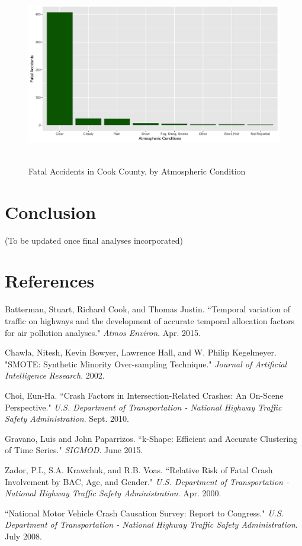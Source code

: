 \documentclass[11pt, oneside,titlepage]{article}   	%
\begin{document}
\begin{figure}[H]
\centering
  \includegraphics[width=15cm,height=8cm,keepaspectratio]{Environmental.png}
\caption{Fatal Accidents in Cook County, by Atmospheric Condition}
\end{figure}


\section*{Conclusion}

(To be updated once final analyses incorporated)


\section*{References}
\begin{hangparas}{1.27cm}{1}
Batterman, Stuart, Richard Cook, and Thomas Justin. ``Temporal variation of traffic on highways and the development of accurate temporal allocation factors for air pollution analyses." \textit{Atmos Environ}. Apr. 2015.

Chawla, Nitesh, Kevin Bowyer, Lawrence Hall, and W. Philip Kegelmeyer. "SMOTE: Synthetic Minority Over-sampling Technique." \textit{Journal of Artificial Intelligence Research}. 2002.

Choi, Eun-Ha. ``Crash Factors in Intersection-Related Crashes: An On-Scene Perspective." \textit{U.S. Department of Transportation - National Highway Traffic Safety Administration}. Sept. 2010.

Gravano, Luis and John Paparrizos. ``k-Shape: Efficient and Accurate Clustering of Time Series." \textit{SIGMOD}. June 2015.

Zador, P.L, S.A. Krawchuk, and R.B. Voas. ``Relative Risk of Fatal Crash Involvement by BAC, Age, and Gender." \textit{U.S. Department of Transportation - National Highway Traffic Safety Administration}. Apr. 2000.

``National Motor Vehicle Crash Causation Survey: Report to Congress." \textit{U.S. Department of Transportation - National Highway Traffic Safety Administration}. July 2008.


\end{hangparas}
\end{document}
